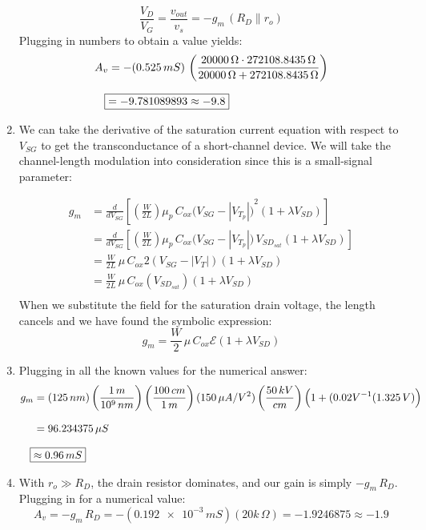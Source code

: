 \documentclass[12pt, fleqn]{article}
\begin{document}
\begin{enumerate}[label=(\alph*)]
{    \begin{equation*}
        \boxed{\frac{V_D}{V_G} = \frac{v_{out}}{v_s} = -g_m\,(R_D \parallel r_o)}
    \end{equation*}
    Plugging in numbers to obtain a value yields:
    \begin{align*}
        A_v &=  -(0.525\,mS)\,\left(\frac{20000\,\Omega \cdot 272108.8435\,\Omega}{20000\,\Omega + 272108.8435\,\Omega}\right)\\[0.25cm]
        \Aboxed{&=-9.781089893 \approx -9.8}
    \end{align*}
    }
    \newpage
    \item
    {
    We can take the derivative of the saturation current equation with respect to $V_{SG}$ to get the transconductance of a short-channel device.  We will take the channel-length modulation into consideration since this is a small-signal parameter:
    
    \begin{align*}
        g_m &= \frac{d}{dV_{SG}}\left[\left(\frac{W}{2L}\right) \mu_p\,C_{ox} {\big(V_{SG} - \left|V_{T_p}\right|\big)}^2 (1 + \lambda V_{SD})\right]\\[0.25cm]
        &= \frac{d}{dV_{SG}}\left[\left(\frac{W}{2L}\right) \mu_p\,C_{ox} \big(V_{SG} - \left|V_{T_p}\right|\big)\,V_{{SD}_{sat}} (1 + \lambda V_{SD})\right]\\[0.25cm]
        &= \frac{W}{2L}\,\mu\,C_{ox}2(V_{SG} - \left|V_T\right|)(1 + \lambda V_{SD})\\[0.25cm]
        &= \frac{W}{2L}\,\mu\,C_{ox}(V_{{SD}_{sat}})(1 + \lambda V_{SD})\\[0.25cm]
    \end{align*}
    When we substitute the field for the saturation drain voltage, the length cancels and we have found the symbolic expression:
    \begin{equation}
        \boxed{g_m = \frac{W}{2}\,\mu\,C_{ox}\mathcal{E}(1 + \lambda V_{SD})}
    \end{equation}
    }
    \item
    {
    Plugging in all the known values for the numerical answer:
    \begin{align*}
        g_m &= (125\,nm)\left(\frac{1\,m}{10^9\,nm}\right)\left(\frac{100\,cm}{1\,m}\right)(150\,\mu A/V^2)\left(\frac{50\,kV}{cm}\right)\Big(1 + (0.02V^{-1}(1.325\,V)\Big)\\[0.25cm]
        &= 96.234375\,\mu S\\[0.25cm]
        \Aboxed{&\approx 0.96\,mS}
    \end{align*}
    }
    \item
    {
    With $r_o \gg R_D$, the drain resistor dominates, and our gain is simply $-g_m\,R_D$.  Plugging in for a numerical value:
    \begin{equation}
        A_v = -g_m\,R_D = -(\num{0.192e-3}\,mS)(20k\,\Omega) = -1.9246875 \boxed{\approx -1.9}
    \end{equation}
    }
\end{enumerate}
\end{document}
